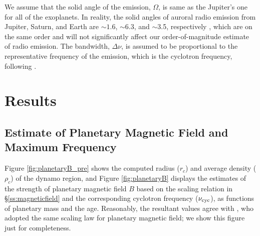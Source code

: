 \documentclass[iop,numberedappendix,apj]{emulateapj}
\def\memoDS#1{\color{blue}$[${\bf #1}$]$ \color{black}}
\begin{document}
We assume that the solid angle of the emission, $\Omega $, is same as the Jupiter's one for all of the exoplanets.
In reality, the solid angles of auroral radio emission from  Jupiter, Saturn, and Earth are $\sim 1.6$, $\sim $6.3, and $\sim $3.5, respectively \citep{desch+kaiser1984}, which are on the same order and will not significantly affect our order-of-magnitude estimate of radio emission. 
The bandwidth, $\Delta \nu$, is assumed to be proportional to the representative frequency of the emission, which is the cyclotron frequency, following \citet{griesmeier2007b}.



\section{Results}
\label{s:result}

\subsection{Estimate of Planetary Magnetic Field and Maximum Frequency}
\label{ss:Bplanet}

Figure \ref{fig:planetaryB_pre} shows the computed radius ($r_c$) and average density ($\rho_c$) of the dynamo region, and Figure \ref{fig:planetaryB} displays the estimates of the strength of planetary magnetic field $B$ based on the scaling relation in \S\ref{ss:magneticfield} and the corresponding cyclotron frequency ($\nu_{\rm cyc}$), as functions of planetary mass and the age. 
Reasonably, the resultant values agree with \citet{reiners2010}, who adopted the same scaling law for planetary magnetic field; we show this figure just for completeness. 
\end{document}
